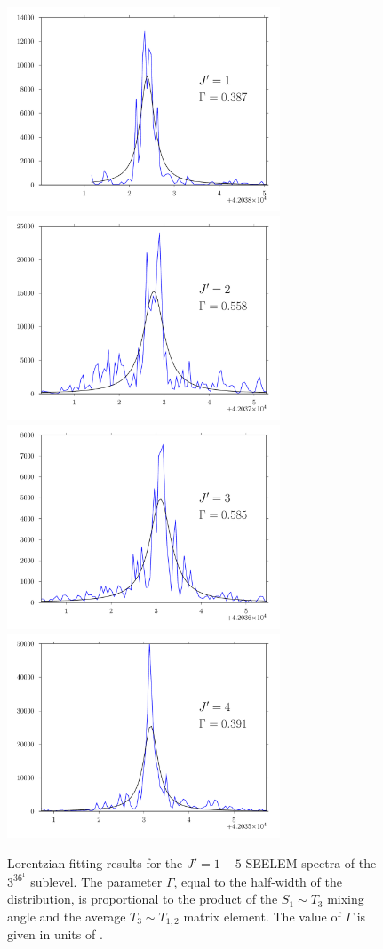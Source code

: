 \documentclass[12pt]{mitthesis}
\begin{document}
\begin{figure}
  \caption{Lorentzian fitting results for the $J'=1-5$ SEELEM spectra
    of the $3^36^1$  sublevel.  The parameter $\Gamma$, equal to
    the half-width of the distribution, is proportional to the product
    of the $S_1 \sim T_3$ mixing angle and the average $T_3 \sim T_{1,2}$
    matrix element.  The value of $\Gamma$ is given in units of \rcm.}
  \label{fig:seelem-fits}
  \vspace{5mm}
  \includegraphics[width=3.2in]{3361-q1-seelemfit}
  \includegraphics[width=3.2in]{3361-q2-seelemfit}
  \includegraphics[width=3.2in]{3361-q3-seelemfit}
  \includegraphics[width=3.2in]{3361-q4-seelemfit}

\end{figure}
\end{document}
